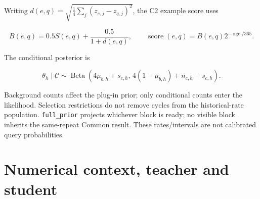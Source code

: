 \endgroup

Writing \(d(e,q)=\sqrt{\frac14\sum_j(z_{e,j}-z_{q,j})^2}\), the C2
example score uses

\[
B(e,q)=0.5S(e,q)+\frac{0.5}{1+d(e,q)},\qquad
\operatorname{score}(e,q)=B(e,q)2^{-\operatorname{age}/365}.
\]

The conditional posterior is

\[
\theta_h\mid\mathcal C\sim\operatorname{Beta}
\left(4\mu_{b,h}+s_{c,h},\,4(1-\mu_{b,h})+n_{c,h}-s_{c,h}\right).
\]

Background counts affect the plug-in prior; only conditional counts enter
the likelihood. Selection restrictions do not remove cycles from the
historical-rate population. \texttt{full\_\allowbreak{}prior} projects whichever block is
ready; no visible block inherits the same-repeat Common result. These
rates/intervals are not calibrated query probabilities.

\section{Numerical context, teacher and student}\label{s:accd5c67f3e09aa6}

\begingroup
\small
{}
\setlength{\tabcolsep}{3pt}

